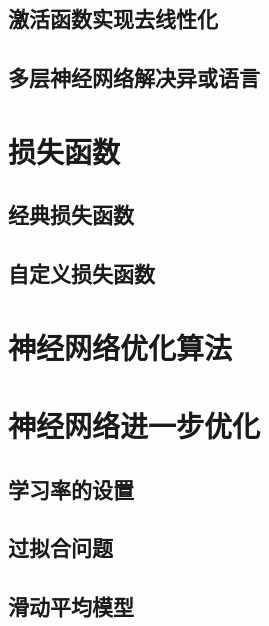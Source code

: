 \documentclass{article} \usepackage{braket} \usepackage{amsmath,amssymb} \usepackage{geometry} \usepackage{graphicx} \usepackage{fancyvrb}\usepackage{braket} \usepackage{bm}\usepackage{hyperref} \usepackage{CJKutf8} \geometry{left=0.2cm,right=0.2cm,top=0.2cm,bottom=0.2cm} \renewcommand{\theequation}{\arabic{section}.\arabic{equation}} \renewcommand{\baselinestretch}{1.5}
\begin{document}
\begin{CJK}{UTF8}{gbsn}
\subsection{激活函数实现去线性化}
\label{sec:org420e81a}

\subsection{多层神经网络解决异或语言}
\label{sec:org32c6c09}

\section{损失函数}
\label{sec:org8d79a79}

\subsection{经典损失函数}
\label{sec:org5239194}
\subsection{自定义损失函数}
\label{sec:org2b3e954}

\section{神经网络优化算法}
\label{sec:org90a2418}
\section{神经网络进一步优化}
\label{sec:org5f20e0b}

\subsection{学习率的设置}
\label{sec:org11bb285}

\subsection{过拟合问题}
\label{sec:org9516d59}

\subsection{滑动平均模型}
\label{sec:org8864399}
  
  
\end{CJK}
\end{document}
